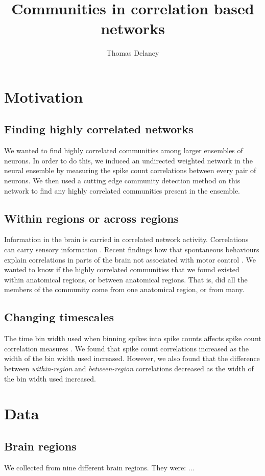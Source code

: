 \documentclass[a4paper,12pt]{article}
\title{Communities in correlation based networks}
\author{Thomas Delaney}
\theoremstyle{definition}
\begin{document}
\tableofcontents

\newpage

\section{Motivation}
    \subsection{Finding highly correlated networks}
    We wanted to find highly correlated communities among larger ensembles of neurons. In order to do this, we induced an undirected weighted network in the neural ensemble by measuring the spike count correlations between every pair of neurons. We then used a cutting edge community detection method \cite{humphries} on this network to find any highly correlated communities present in the ensemble.

    \subsection{Within regions or across regions}
    Information in the brain is carried in correlated network activity. Correlations can carry sensory information \cite{cohen1}. Recent findings how that spontaneous behaviours explain correlations in parts of the brain not associated with motor control \cite{stringer}. We wanted to know if the highly correlated communities that we found existed within anatomical regions, or between anatomical regions. That is, did all the members of the community come from one anatomical region, or from many.

    \subsection{Changing timescales}
    The time bin width used when binning spikes into spike counts affects spike count correlation measures \cite{cohen2}. We found that spike count correlations increased as the width of the bin width used increased. However, we also found that the difference between \textit{within-region} and \textit{between-region} correlations decreased as the width of the bin width used increased. 


\section{Data}
    \subsection{Brain regions}
    We collected from nine different brain regions. They were: ...
\end{document}
